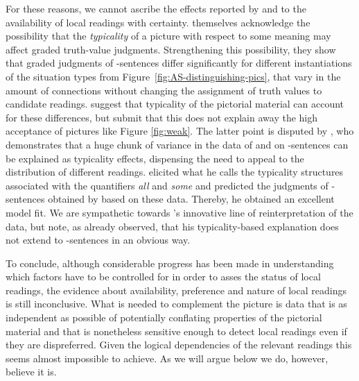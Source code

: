 \documentclass[fleqn,reqno,10pt,draft]{article}
\newcommand{\as}{\acro{as}}
\renewcommand{\es}{\acro{es}}
\begin{document}
For these reasons, we cannot ascribe the effects reported by
\citeauthor{CliftonDube2010:Embedded-Implic} and
\citeauthor{ChemlaSpector2010:Experimental-Ev} to the availability of
local readings with
certainty. \citet{ChemlaSpector2010:Experimental-Ev} themselves
acknowledge the possibility that the \emph{typicality} of a picture
with respect to some meaning may affect graded truth-value
judgments. Strengthening this possibility, they show that graded
judgments of \as-sentences differ significantly for different
instantiations of the situation types from
Figure~\ref{fig:AS-distinguishing-pics}, that vary in the amount of
connections without changing the assignment of truth values to
candidate readings. \citeauthor{ChemlaSpector2010:Experimental-Ev}
suggest that typicality of the pictorial material can account for
these differences, but submit that this does not explain away the high
acceptance of pictures like Figure \ref{fig:weak}. The latter point is
disputed by \citet{Tielvan-Tiel2012:Embedded-Scalar}, who demonstrates
that a huge chunk of variance in the data of
\citeauthor{CliftonDube2010:Embedded-Implic} and
\citeauthor{ChemlaSpector2010:Experimental-Ev} on \as-sentences can be
explained as typicality effects, dispensing the need to appeal to the
distribution of different
readings. \citet{Tielvan-Tiel2012:Embedded-Scalar} elicited what he
calls the typicality structures associated with the quantifiers {\it
  all} and {\it some} and predicted the judgments of \as-sentences
obtained by \citeauthor{ChemlaSpector2010:Experimental-Ev} based on
these data. Thereby, he obtained an excellent model fit. We are
sympathetic towards \citeauthor{Tielvan-Tiel2012:Embedded-Scalar}'s
innovative line of reinterpretation of the data, but note, as
\citet{ChemlaSpector2010:Experimental-Ev} already observed, that his
typicality-based explanation does not extend to \es-sentences in an
obvious way.

To conclude, although considerable progress has been made in
understanding which factors have to be controlled for in order to
asses the status of local readings, the evidence about availability,
preference and nature of local readings is still inconclusive. What is
needed to complement the picture is data that is as independent as
possible of potentially conflating properties of the pictorial
material and that is nonetheless sensitive enough to detect local
readings even if they are dispreferred. Given the logical dependencies
of the relevant readings this seems almost impossible to achieve. As
we will argue below we do, however, believe it is.
\end{document}
